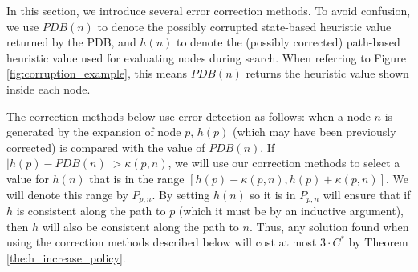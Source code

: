 \documentclass[letterpaper]{article}
\begin{document}
In this section, we introduce several error correction methods.
To avoid confusion, we use $PDB(n)$ to denote the possibly corrupted state-based heuristic value returned by the PDB, and $h(n)$ to denote the (possibly corrected) path-based heuristic value used for evaluating nodes during search.
When referring to Figure \ref{fig:corruption_example}, this means $PDB(n)$ returns the heuristic value shown inside each node.

The correction methods below use error detection as follows: when a node $n$ is generated by the expansion of node $p$, $h(p)$ (which may have been previously corrected) is compared with the value of $PDB(n)$.
If $|h(p) - PDB(n)| > \kappa(p, n)$, we will use our correction methods to select a value for $h(n)$ that is in the range $[h(p)-\kappa(p,n),h(p)+\kappa(p,n)]$.
We will denote this range by $P_{p,n}$.
By setting $h(n)$ so it is in $P_{p,n}$ will ensure that if $h$ is consistent along the path to $p$ (which it must be by an inductive argument), then $h$ will also be consistent along the path to $n$.
Thus, any solution found when using the correction methods described below will cost at most $3 \cdot C^*$  by Theorem \ref{the:h_increase_policy}.


%







\end{document}
